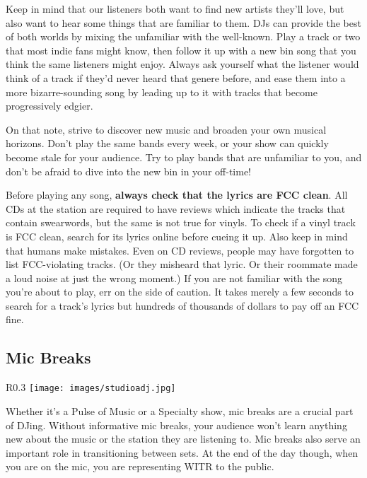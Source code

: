 \documentclass{witrman}
\begin{document}
Keep in mind that our listeners both want to find new artists they'll love, but
also want to hear some things that are familiar to them.  DJs can provide the
best of both worlds by mixing the unfamiliar with the well-known.  Play a track
or two that most indie fans might know, then follow it up with a new bin song
that you think the same listeners might enjoy.  Always ask yourself what the
listener would think of a track if they'd never heard that genere before, and
ease them into a more bizarre-sounding song by leading up to it with tracks that
become progressively edgier.

On that note, strive to discover new music and broaden your own musical
horizons.  Don't play the same bands every week, or your show can quickly become
stale for your audience.  Try to play bands that are unfamiliar to you, and don't
be afraid to dive into the new bin in your off-time!

Before playing any song, \textbf{always check that the lyrics are FCC clean}.
All CDs at the station are required to have reviews which indicate the tracks
that contain swearwords, but the same is not true for vinyls.  To check if a
vinyl track is FCC clean, search for its lyrics online before cueing it up.
Also keep in mind that humans make mistakes.  Even on CD reviews, people may
have forgotten to list FCC-violating tracks.  (Or they misheard that lyric.  Or
their roommate made a loud noise at just the wrong moment.)  If you are not
familiar with the song you're about to play, err on the side of caution.  It
takes merely a few seconds to search for a track's lyrics but hundreds of
thousands of dollars to pay off an FCC fine.

\subsection{Mic Breaks}

\begin{wrapfigure}{R}{0.3\linewidth}
    \centering
    \texttt{[image: images/studioadj.jpg]}
\end{wrapfigure}

Whether it's a Pulse of Music or a Specialty show, mic breaks are a crucial part
of DJing.  Without informative mic breaks, your audience won't learn anything
new about the music or the station they are listening to.  Mic breaks also serve
an important role in transitioning between sets.  At the end of the day though,
when you are on the mic, you are representing WITR to the public.
\end{document}
